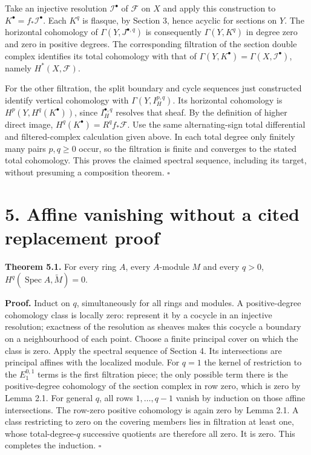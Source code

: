 \documentclass[11pt,a4paper,openany]{report}
\begin{document}
Take an injective resolution \(\mathcal I^\bullet\) of \(\mathcal F\) on \(X\) and apply this construction to \(K^\bullet=f_*\mathcal I^\bullet\). Each \(K^q\) is flasque, by Section 3, hence acyclic for sections on \(Y\). The horizontal cohomology of \(\Gamma(Y,J^{\bullet,q})\) is consequently \(\Gamma(Y,K^q)\) in degree zero and zero in positive degrees. The corresponding filtration of the section double complex identifies its total cohomology with that of \(\Gamma(Y,K^\bullet)=\Gamma(X,\mathcal I^\bullet)\), namely \(H^*(X,\mathcal F)\).

For the other filtration, the split boundary and cycle sequences just constructed identify vertical cohomology with \(\Gamma(Y,I_H^{p,q})\). Its horizontal cohomology is \(H^p(Y,H^q(K^\bullet))\), since \(I_H^{\bullet,q}\) resolves that sheaf. By the definition of higher direct image, \(H^q(K^\bullet)=R^qf_*\mathcal F\). Use the same alternating-sign total differential and filtered-complex calculation given above. In each total degree only finitely many pairs \(p,q\ge0\) occur, so the filtration is finite and converges to the stated total cohomology. This proves the claimed spectral sequence, including its target, without presuming a composition theorem. \(\square\)

\section{5. Affine vanishing without a cited replacement proof}\label{AG-RG-S01-affine-vanishing-without-a-cited-replacement-proof}

\textbf{Theorem 5.1.} For every ring \(A\), every \(A\)-module \(M\) and every \(q>0\), \(H^q(\operatorname{Spec}A,\widetilde M)=0\).

\textbf{Proof.} Induct on \(q\), simultaneously for all rings and modules. A positive-degree cohomology class is locally zero: represent it by a cocycle in an injective resolution; exactness of the resolution as sheaves makes this cocycle a boundary on a neighbourhood of each point. Choose a finite principal cover on which the class is zero. Apply the spectral sequence of Section 4. Its intersections are principal affines with the localized module. For \(q=1\) the kernel of restriction to the \(E_1^{0,1}\) terms is the first filtration piece; the only possible term there is the positive-degree cohomology of the section complex in row zero, which is zero by Lemma 2.1. For general \(q\), all rows \(1,\ldots,q-1\) vanish by induction on those affine intersections. The row-zero positive cohomology is again zero by Lemma 2.1. A class restricting to zero on the covering members lies in filtration at least one, whose total-degree-\(q\) successive quotients are therefore all zero. It is zero. This completes the induction. \(\square\)
\end{document}

